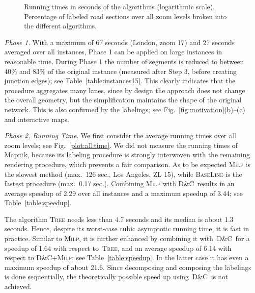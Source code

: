 \documentclass[a4paper,11pt]{article}
\newcommand{\GreedyAlgo}{\textsc{Base\-Line}\xspace}
\newcommand{\TreeAlgo}{\textsc{Tree}\xspace}
\newcommand{\ILPAlgo}{\textsc{Milp}\xspace}
\newcommand{\Shredder}{\textsc{D\&C}}
\begin{document}
\begin{figure}[t]
\centering
{}
  \centering {}

  \caption{ 
   Running times in seconds of the
    algorithms (logarithmic scale). 
  Percentage of labeled road sections over all  zoom levels broken into the different  algorithms. 
}\vspace{-2ex}
\end{figure}






\textit{Phase 1.}   With a maximum of 67 seconds (London,
zoom 17) and 27 seconds averaged over all instances, Phase 1 can be
applied on large instances in reasonable time. During Phase 1 the number of segments
is reduced to between $40 \%$ and $83 \%$ of the original instance (measured after Step 3, before creating junction edges); see
Table~\ref{table:instances15}. This clearly indicates that the
procedure aggregates many lanes, since by design the approach does not
change the overall geometry, but the simplification maintains the shape of the original network. This is also confirmed by the
labelings; see Fig.~\ref{fig:motivation}(b)--(c) and interactive maps.

\textit{Phase 2, Running Time.} We first consider the average
running times over all zoom levels; see Fig.~\ref{plot:all:time}. We
did not measure the running times of Mapnik, because its labeling
procedure is strongly interwoven with the remaining rendering
procedure, which prevents a fair comparison. As to be expected \ILPAlgo is the slowest method (max.\ 126
sec., Los Angeles, ZL 15), while \GreedyAlgo is the fastest procedure
(max.\ 0.17 sec.). Combining \ILPAlgo with \Shredder\ results in an
average speedup of 2.29 over all instances and a maximum speedup of
3.44; see Table~\ref{table:speedup}. 

The algorithm \TreeAlgo needs less than 4.7 seconds and its median is
about 1.3 seconds.  Hence, despite its worst-case cubic asymptotic
running time, it is fast in practice. Similar to \ILPAlgo, it is
further enhanced by combining it with~\Shredder\ for a speedup of 1.64
with respect to~\TreeAlgo, and an average speedup of 6.14 with respect
to \Shredder+\ILPAlgo; see Table~\ref{table:speedup}. In the latter
case it has even a maximum speedup of about 21.6.  Since decomposing
and composing the labelings is done sequentially, the theoretically
possible speed up using~\Shredder\ is not achieved.
 
\end{document}
